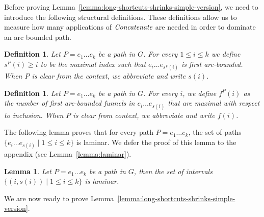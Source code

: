 \documentclass[11pt]{article}
\newtheorem{lemma}[theorem]{Lemma}
\newtheorem{definition}[theorem]{Definition}
\newcommand{\Concat}{\mbox{{\it Concatenate}}}
\begin{document}
Before proving Lemma~\ref{lemma:long-shortcuts-shrinks-simple-version}, we need to introduce the following structural definitions.
These definitions allow us to measure how many applications of $\Concat$ are needed in order to dominate an arc bounded path.


\begin{definition}
    Let $P=e_1 \ldots e_k$ be a path in $G$. For every $1\le i \le k$ we define
    $s^P(i)\ge i$ to be the maximal index such that $e_i \ldots e_{s^P(i)}$ is first arc-bounded.
    When $P$ is clear from the context, we abbreviate and write $s(i)$. 
\end{definition}

\begin{definition}\label{def:funnel-distance-simple-version}
    Let $P= e_1 \ldots e_k$ be a path in $G$. For every $i$, we define $f^P(i)$ as the number of first arc-bounded funnels in $e_i \ldots e_{s(i)}$ that are maximal with respect to inclusion.
    When $P$ is clear from context, we abbreviate and write $f(i)$.
\end{definition}


The following lemma proves that for every path $P=e_1\ldots e_k$, the set of paths $\{e_i \ldots e_{s(i)}\mid 1\le i \le k\}$ is laminar. We defer the proof of this lemma to the appendix (see Lemma~\ref{lemma:laminar}).

\begin{lemma}\label{lemma:laminar-simple-version}
    Let $P=e_1 \ldots e_k$ be a path in $G$, then the set of intervals $\{(i, s(i)) \mid 1\le i \le k \}$ is laminar.
\end{lemma}

We are now ready to prove Lemma~\ref{lemma:long-shortcuts-shrinks-simple-version}.
\end{document}
